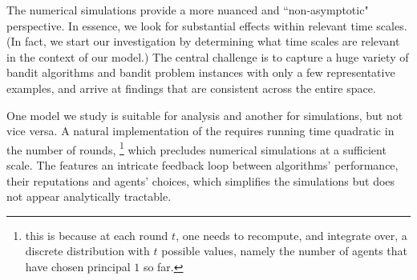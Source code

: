 The numerical simulations provide a more nuanced and ``non-asymptotic" perspective. In essence, we look for substantial effects within relevant time scales. (In fact, we start our investigation by determining what time scales are relevant in the context of our model.) The central challenge is to capture a huge variety of bandit algorithms and bandit problem instances with only a few representative examples, and arrive at findings that are consistent across the entire space.

One model we study is suitable for analysis and another for simulations, but not vice versa. A natural implementation of the \TheoryModel requires running time quadratic in the number of rounds,%
\footnote{\label{fn:Tsquared}\Eg this is because at each round $t$, one needs to recompute, and integrate over, a discrete distribution with $t$ possible values, namely the number of agents that have chosen principal $1$ so far.}
which precludes numerical simulations at a sufficient scale. The \ExptsModel features an intricate feedback loop between algorithms' performance, their reputations and agents' choices, which simplifies the simulations but does not appear analytically tractable.











